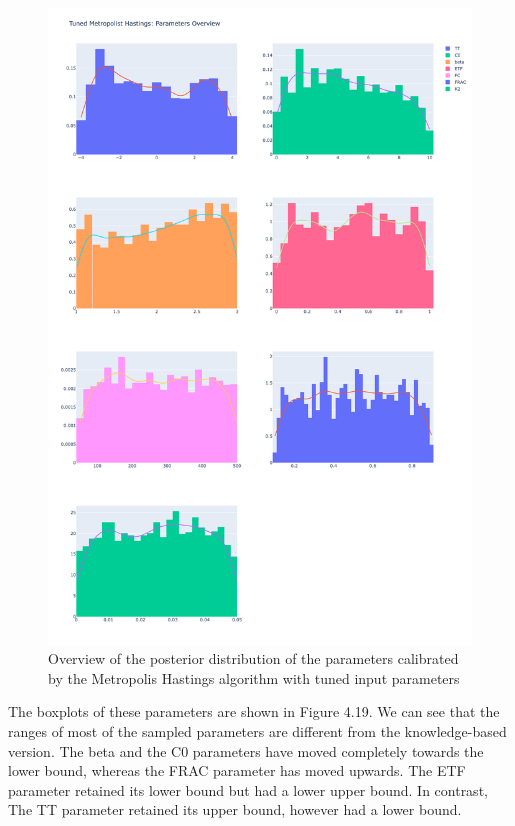 \begin{figure}
    \centering
    \includegraphics[width=1\textwidth]{figures/basic_mh/tuned_mh/tuned_mh_parameters_overview.png}
    \captionsetup{width=.8\textwidth}
    \caption{Overview of the posterior distribution of the parameters calibrated by the Metropolis Hastings algorithm with tuned input parameters}
    \label{fig:enter-label}
\end{figure}


The boxplots of these parameters are shown in Figure 4.19. We can see that the ranges of most of the sampled parameters are different from the knowledge-based version. The beta and the C0 parameters have moved completely towards the lower bound, whereas the FRAC parameter has moved upwards. The ETF parameter retained its lower bound but had a lower upper bound. In contrast, The TT parameter retained its upper bound, however had a lower bound.


